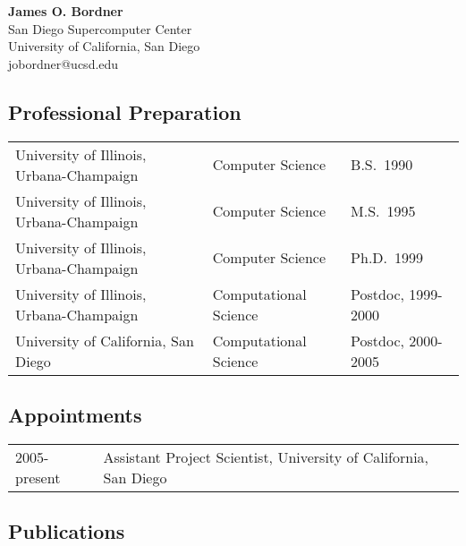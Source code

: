 \documentclass[11pt,letterpaper]{article}
\begin{document}
\begin{center}
\textbf{\large{James O. Bordner}} \\
San Diego Supercomputer Center \\
University of California, San Diego \\
jobordner@ucsd.edu \\
\end{center}

\subsection{Professional Preparation}
\begin{tabular}{lll}
University of Illinois, Urbana-Champaign &  Computer Science & B.S.~1990 \\
University of Illinois, Urbana-Champaign & Computer Science  & M.S.~1995 \\
University of Illinois, Urbana-Champaign & Computer Science  & Ph.D.~1999 \\
University of Illinois, Urbana-Champaign & Computational Science  & Postdoc, 1999-2000 \\
University of California, San Diego      & Computational Science  & Postdoc, 2000-2005
\end{tabular}
\subsection{Appointments}
\begin{tabular}{ll}
2005-present & Assistant Project Scientist, University of California, San Diego
\end{tabular}

\subsection{Publications}
\end{document}
